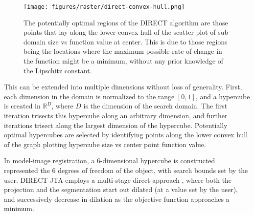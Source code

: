 \begin{figure}[h!]
    \begin{center}
      \texttt{[image: figures/raster/direct-convex-hull.png]}
    \end{center}
    \caption[The potentially optimal regions of the DIRECT algorithm are those points that lay along the lower convex hull of the scatter plot of sub-domain size vs function value at center]{The potentially optimal regions of the DIRECT algorithm are those points that lay along the lower convex hull of the scatter plot of sub-domain size vs function value at center. This is due to those regions being the locations where the maximum possible rate of change in the function might be a minimum, without any prior knowledge of the Lipschitz constant.}
    \label{fig:direct-convex-hull}
\end{figure}

This can be extended into multiple dimensions without loss of generality.
First, each dimension in the domain is normalized to the range $[0,1]$, and a hypercube is created in $\mathbb{R}^D$, where $D$ is the dimension of the search domain.
The first iteration trisects this hypercube along an arbitrary dimension, and further iterations trisect along the largest dimension of the hypercube.
Potentially optimal hypercubes are selected by identifying points along the lower convex hull of the graph plotting hypercube size vs center point function value.



In model-image registration, a 6-dimensional hypercube is constructed represented the 6 degrees of freedom of the object, with search bounds set by the user.
DIRECT-JTA employs a multi-stage direct approach \cite{floodAutomatedRegistration3D2018}, where both the projection and the segmentation start out dilated (at a value set by the user), and successively decrease in dilation as the objective function approaches a minimum.

